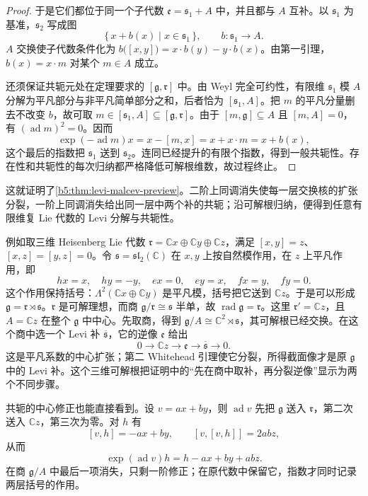 \begin{proof}
	于是它们都位于同一个子代数 \(\mathfrak e=\mathfrak s_1+A\) 中，并且都与 \(A\) 互补。以 \(\mathfrak s_1\) 为基准，\(\mathfrak s_2\) 写成图
	\[
		\bigl\{\,x+b(x)\mid x\in\mathfrak s_1\,\bigr\}, \qquad b:\mathfrak s_1\longrightarrow A.
	\]
	\(A\) 交换使子代数条件化为 \(b\bigl([x,y]\bigr)=x\cdot b(y)-y\cdot b(x)\)。由第一引理，\(b(x)=x\cdot m\) 对某个 \(m\in A\) 成立。

	还须保证共轭元处在定理要求的 \([\mathfrak g,\mathfrak r]\) 中。由 Weyl 完全可约性，有限维 \(\mathfrak s_1\) 模 \(A\) 分解为平凡部分与非平凡简单部分之和，后者恰为 \([\mathfrak s_1,A]\)。把 \(m\) 的平凡分量删去不改变 \(b\)，故可取 \(m\in[\mathfrak s_1,A]\subseteq[\mathfrak g,\mathfrak r]\)。由于 \([m,\mathfrak g]\subseteq A\) 且 \([m,A]=0\)，有 \((\operatorname{ad}m)^2=0\)。因而
	\[
		\exp(-\operatorname{ad}m)x=x-[m,x]=x+x\cdot m=x+b(x),
	\]
	这个最后的指数把 \(\mathfrak s_1\) 送到 \(\mathfrak s_2\)。连同已经提升的有限个指数，得到一般共轭性。存在性和共轭性的每次归纳都严格降低可解根维数，故过程终止。
\end{proof}

这就证明了\cref{b5:thm:levi-malcev-preview}。二阶上同调消失使每一层交换核的扩张分裂，一阶上同调消失给出同一层中两个补的共轭；沿可解根归纳，便得到任意有限维复 Lie 代数的 Levi 分解与共轭性。

\ProseParagraphBreak

例如取三维 Heisenberg Lie 代数 \(\mathfrak r=\mathbb Cx\oplus\mathbb Cy\oplus\mathbb Cz\)，满足 \([x,y]=z\)、\([x,z]=[y,z]=0\)。令 \(\mathfrak s=\mathfrak{sl}_2(\mathbb C)\) 在 \(x,y\) 上按自然模作用，在 \(z\) 上平凡作用，即
\[
	hx=x,\quad hy=-y,\quad ex=0,\quad ey=x,\quad fx=y,\quad fy=0.
\]
这个作用保持括号：\(\Lambda^2(\mathbb Cx\oplus\mathbb Cy)\) 是平凡模，括号把它送到 \(\mathbb Cz\)。于是可以形成 \(\mathfrak g=\mathfrak r\rtimes\mathfrak s\)。\(\mathfrak r\) 是可解理想，而商 \(\mathfrak g/\mathfrak r\cong\mathfrak s\) 半单，故 \(\operatorname{rad}\mathfrak g=\mathfrak r\)。这里 \(\mathfrak r' =\mathbb Cz\)，且 \(A=\mathbb Cz\) 在整个 \(\mathfrak g\) 中中心。先取商，得到 \(\mathfrak g/A\cong\mathbb C^2\rtimes\mathfrak s\)，其可解根已经交换。在这个商中选一个 Levi 补 \(\overline{\mathfrak s}\)，它的逆像 \(\mathfrak e\) 给出
\[
	0\longrightarrow\mathbb Cz\longrightarrow\mathfrak e \longrightarrow\overline{\mathfrak s}\longrightarrow0.
\]
这是平凡系数的中心扩张；第二 Whitehead 引理使它分裂，所得截面像才是原 \(\mathfrak g\) 中的 Levi 补。这个三维可解根把证明中的“先在商中取补，再分裂逆像”显示为两个不同步骤。

\ProseParagraphBreak

共轭的中心修正也能直接看到。设 \(v=ax+by\)，则 \(\operatorname{ad}v\) 先把 \(\mathfrak g\) 送入 \(\mathfrak r\)，第二次送入 \(\mathbb Cz\)，第三次为零。对 \(h\) 有
\[
	[v,h]=-ax+by,\qquad [v,[v,h]]=2abz,
\]
从而
\[
	\exp(\operatorname{ad}v)h=h-ax+by+abz.
\]
在商 \(\mathfrak g/A\) 中最后一项消失，只剩一阶修正；在原代数中保留它，指数才同时记录两层括号的作用。
